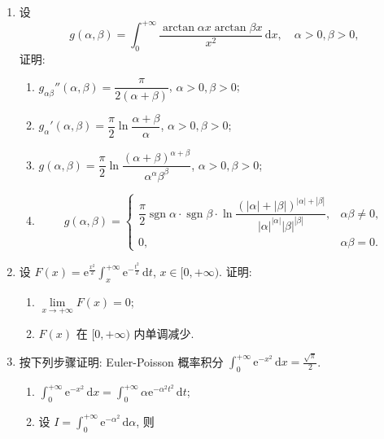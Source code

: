 \begin{exblock}[思考题 15.3]
\begin{enumerate}
  证明:
  \begin{enumerate}
    \item $g'(\alpha)=\dfrac{\pi}{2}\left(1-\dfrac{|\alpha|}{\sqrt{1+\alpha^{2}}}\right)$;
    \item $g(\alpha)=\dfrac{\pi}{2}(|\alpha|+1-\sqrt{1+\alpha^{2}})\operatorname{sgn}\alpha$ ($-\infty<\alpha<+\infty$).
  \end{enumerate}
  \item 设
  \[
    g(\alpha,\beta)=\int_{0}^{+\infty}\frac{\arctan\alpha x\arctan\beta x}{x^{2}}\,\mathrm{d}x,\quad\alpha>0,\beta>0,
\]
  证明:
  \begin{enumerate}
    \item $g_{\alpha\beta}''(\alpha,\beta)=\dfrac{\pi}{2(\alpha+\beta)}$, $\alpha>0,\beta>0$;
    \item $g_{\alpha}'(\alpha,\beta)=\dfrac{\pi}{2}\ln\dfrac{\alpha+\beta}{\alpha}$, $\alpha>0,\beta>0$;
    \item $g(\alpha,\beta)=\dfrac{\pi}{2}\ln\dfrac{(\alpha+\beta)^{\alpha+\beta}}{\alpha^{\alpha}\beta^{\beta}}$, $\alpha>0,\beta>0$;
    \item
    \[
      g(\alpha,\beta)=\begin{cases}
        \dfrac{\pi}{2}\operatorname{sgn}\alpha\cdot\operatorname{sgn}\beta\cdot\ln\dfrac{(|\alpha|+|\beta|)^{|\alpha|+|\beta|}}{|\alpha|^{|\alpha|}|\beta|^{|\beta|}}, & \alpha\beta\neq0,\\
        0, & \alpha\beta=0.
\end{cases}
\]
  \end{enumerate}
  \item 设 $F(x)=\mathrm{e}^{\frac{x^{2}}{2}}\displaystyle\int_{x}^{+\infty}\mathrm{e}^{-\frac{t^{2}}{2}}\,\mathrm{d}t$, $x\in[0,+\infty)$. 证明:
  \begin{enumerate}
    \item $\lim\limits_{x\to+\infty}F(x)=0$;
    \item $F(x)$ 在 $[0,+\infty)$ 内单调减少.
  \end{enumerate}
  \item 按下列步骤证明: Euler-Poisson 概率积分 $\displaystyle\int_{0}^{+\infty}\mathrm{e}^{-x^{2}}\,\mathrm{d}x=\frac{\sqrt{\pi}}{2}$.
  \begin{enumerate}
    \item $\displaystyle\int_{0}^{+\infty}\mathrm{e}^{-x^{2}}\,\mathrm{d}x=\int_{0}^{+\infty}\alpha\mathrm{e}^{-\alpha^{2}t^{2}}\,\mathrm{d}t$;
    \item 设 $I=\displaystyle\int_{0}^{+\infty}\mathrm{e}^{-\alpha^{2}}\,\mathrm{d}\alpha$, 则

\end{enumerate}
\end{enumerate}
\end{exblock}
